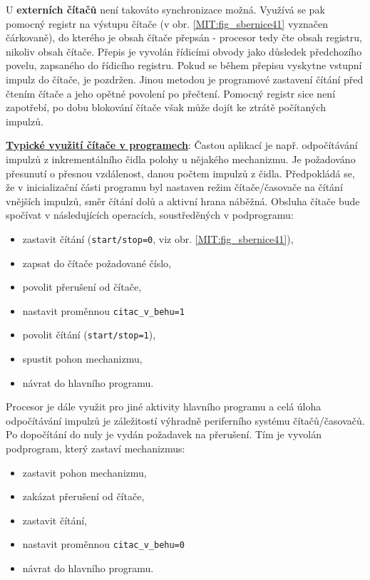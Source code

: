         U \textbf{externích čítačů} není takováto synchronizace možná. Využívá se pak pomocný 
        registr na výstupu čítače (v obr. \ref{MIT:fig_sbernice41} vyznačen čárkovaně), do kterého 
        je obsah čítače přepsán - procesor tedy čte obsah registru, nikoliv obsah čítače. Přepis je 
        vyvolán řídicími obvody jako důsledek předchozího povelu, zapsaného do řídicího registru. 
        Pokud se během přepisu vyskytne vstupní impulz do čítače, je pozdržen. Jinou metodou je 
        programové zastavení čítání před čtením čítače a jeho opětné povolení po přečtení. Pomocný 
        registr sice není zapotřebí, po dobu blokování čítače však může dojít ke ztrátě počítaných 
        impulzů.
        
        \underline{\textbf{Typické využití čítače v programech}}:
        Častou aplikací je např. odpočítávání impulzů z inkrementálního čidla polohy u nějakého 
        mechanizmu. Je požadováno přesunutí o přesnou vzdálenost, danou počtem impulzů z čidla. 
        Předpokládá se, že v inicializační části programu byl nastaven režim čítače/časovače na 
        čítání vnějších impulzů, směr čítání dolů a aktivní hrana náběžná. Obsluha čítače bude 
        spočívat v následujících operacích, soustředěných v podprogramu:
        \begin{itemize}\addtolength{\itemsep}{-0.5\baselineskip}
          \item zastavit čítání (\texttt{start/stop=0}, viz obr. \ref{MIT:fig_sbernice41}),
          \item zapsat do čítače požadované číslo,
          \item povolit přerušení od čítače,
          \item nastavit proměnnou \texttt{citac\_v\_behu=1}
          \item povolit čítání (\texttt{start/stop=1}),
          \item spustit pohon mechanizmu,
          \item návrat do hlavního programu.          
        \end{itemize}
        Procesor je dále využit pro jiné aktivity hlavního programu a celá úloha odpočítávání 
        impulzů je záležitostí výhradně periferního systému čítačů/časovačů. Po dopočítání do nuly 
        je vydán požadavek na přerušení. Tím je vyvolán podprogram, který zastaví mechanizmus:
        \begin{itemize}\addtolength{\itemsep}{-0.5\baselineskip}
          \item zastavit pohon mechanizmu,
          \item zakázat přerušení od čítače,
          \item zastavit čítání,
          \item nastavit proměnnou \texttt{citac\_v\_behu=0}
          \item návrat do hlavního programu.          
        \end{itemize}
        

